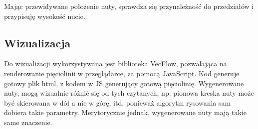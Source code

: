 \documentclass[a4paper,11pt]{article}
\begin{document}
Mając przewidywane położenie nuty, sprawdza się przynależność do przedziałów i przypisuję wysokość nucie.

\subsection{Wizualizacja}
Do wizualizacji wykorzystywana jest biblioteka VecFlow, pozwalająca na renderowanie pięciolinii w przeglądarce, za pomocą JavaScript.
Kod generuje gotowy plik html, z kodem w JS generujący gotową pięciolinię.
Wygenerowane nuty, mogą wizualnie różnić się od tych czytanych,
np. pionowa kreska nuty może być skierowana w dół a nie w górę, itd. ponieważ algorytm rysowania sam dobiera takie parametry.
Merytorycznie jednak, wygenerowane nuty mają takie same znaczenie.



\end{document}
